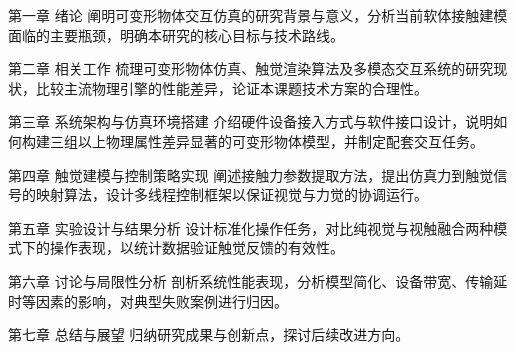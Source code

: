 第一章 绪论
    阐明可变形物体交互仿真的研究背景与意义，分析当前软体接触建模面临的主要瓶颈，明确本研究的核心目标与技术路线。

第二章 相关工作
    梳理可变形物体仿真、触觉渲染算法及多模态交互系统的研究现状，比较主流物理引擎的性能差异，论证本课题技术方案的合理性。

第三章 系统架构与仿真环境搭建
    介绍硬件设备接入方式与软件接口设计，说明如何构建三组以上物理属性差异显著的可变形物体模型，并制定配套交互任务。

第四章 触觉建模与控制策略实现
    阐述接触力参数提取方法，提出仿真力到触觉信号的映射算法，设计多线程控制框架以保证视觉与力觉的协调运行。

第五章 实验设计与结果分析
    设计标准化操作任务，对比纯视觉与视触融合两种模式下的操作表现，以统计数据验证触觉反馈的有效性。

第六章 讨论与局限性分析
    剖析系统性能表现，分析模型简化、设备带宽、传输延时等因素的影响，对典型失败案例进行归因。

第七章 总结与展望
    归纳研究成果与创新点，探讨后续改进方向。
